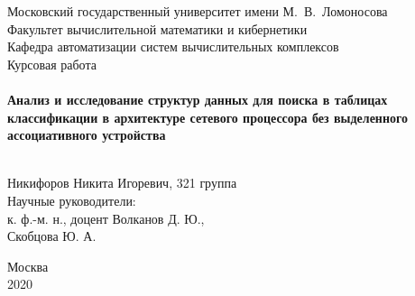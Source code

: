\documentclass[a4paper, 12pt, titlepage, finall]{extreport}
\begin{document}
    \begin{titlepage}
        \begin{center}
            {\small \sc Московский государственный университет имени М.~В.~Ломоносова\\
            Факультет вычислительной математики и кибернетики\\
            Кафедра автоматизации систем вычислительных комплексов\\}
            \vfill
            {\large \sc Курсовая работа}\\~\\

            {\large \bf Анализ и исследование структур данных для поиска в таблицах классификации в архитектуре сетевого процессора без выделенного ассоциативного устройства}\\~\\

        \end{center}
        
        \begin{flushright}
            \vfill
            \vfill
            {Никифоров Никита Игоревич, 321 группа}\\
            {Научные руководители:}\\
            {к. ф.-м. н., доцент Волканов Д. Ю.,}\\
            {Скобцова Ю. А.}\\
        \end{flushright}

        \begin{center}
            \vfill
            {\small Москва\\2020}
        \end{center}
    \end{titlepage}
\end{document}
